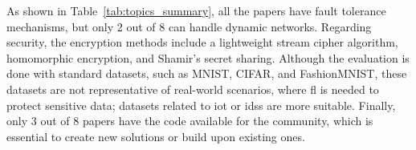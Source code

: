 \begin{table}[!htb]
    \caption[Categorization of Reviewed Papers]{Categorization of the 8 selected papers from the systematic literature review, classifying each study based on its demonstrated capabilities and contributions across key topics such as fault tolerance, elasticity, scalability, security, evaluation methods, and code availability}
    \label{tab:topics_summary}
    \centering
\end{table}

As shown in Table~\ref{tab:topics_summary}, all the papers have fault tolerance mechanisms, but only 2 out of 8 can handle dynamic networks. Regarding security, the encryption methods include a lightweight stream cipher algorithm, homomorphic encryption, and Shamir's secret sharing. Although the evaluation is done with standard datasets, such as MNIST, CIFAR, and FashionMNIST, these datasets are not representative of real-world scenarios, where \ac{fl} is needed to protect sensitive data; datasets related to \ac{iot} or \acp{ids} are more suitable. Finally, only 3 out of 8 papers have the code available for the community, which is essential to create new solutions or build upon existing ones.



